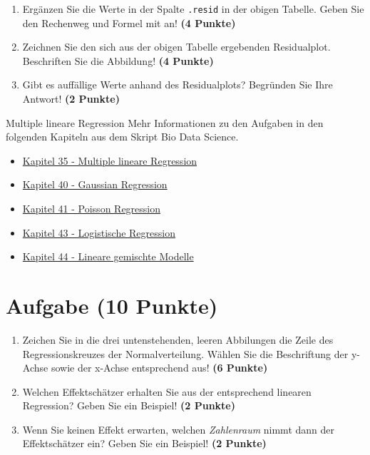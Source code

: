 \documentclass[a4paper, 10pt]{scrartcl}\usepackage[]{graphicx}\usepackage[]{xcolor}
\begin{document}
\begin{enumerate}
\item Erg{\"a}nzen Sie die Werte in der Spalte \texttt{.resid} in der obigen
  Tabelle. Geben Sie den Rechenweg und Formel mit an! \textbf{(4 Punkte)}
\item Zeichnen Sie den sich aus der obigen Tabelle ergebenden
  Residualplot. Beschriften Sie die Abbildung! \textbf{(4 Punkte)}
\item Gibt es auff{\"a}llige Werte anhand des Residualplots? Begr{\"u}nden Sie Ihre
  Antwort! \textbf{(2 Punkte)}
\end{enumerate}
 
\clearpage
\begin{graybox}{Multiple lineare Regression}
Mehr Informationen zu den Aufgaben in den folgenden Kapiteln aus dem Skript Bio Data Science.
  \begin{itemize}
  \item \href{https://jkruppa.github.io/stat-modeling-basic.html}{Kapitel 35 - Multiple lineare Regression}
  \item \href{https://jkruppa.github.io/stat-modeling-gaussian.html}{Kapitel 40 - Gaussian Regression}
  \item \href{https://jkruppa.github.io/stat-modeling-poisson.html}{Kapitel 41 - Poisson Regression}
  \item \href{https://jkruppa.github.io/stat-modeling-logistic.html}{Kapitel 43 - Logistische Regression}
  \item \href{https://jkruppa.github.io/stat-modeling-mixed.html}{Kapitel 44 - Lineare gemischte Modelle}
  \end{itemize}
\end{graybox}

\section{Aufgabe \hfill (10 Punkte)}



\begin{enumerate}
\item Zeichen Sie in die drei untenstehenden, leeren Abbilungen die Zeile des
  Regressionskreuzes der Normalverteilung. W{\"a}hlen Sie die Beschriftung der
  y-Achse sowie der x-Achse entsprechend aus! \textbf{(6 Punkte)}
\item Welchen Effektsch{\"a}tzer erhalten Sie aus der entsprechend linearen
  Regression? Geben Sie ein Beispiel! \textbf{(2 Punkte)}
\item Wenn Sie keinen Effekt erwarten, welchen \textit{Zahlenraum} nimmt dann
  der Effektsch{\"a}tzer ein? Geben Sie ein Beispiel! \textbf{(2 Punkte)}
\end{enumerate}
\end{document}
